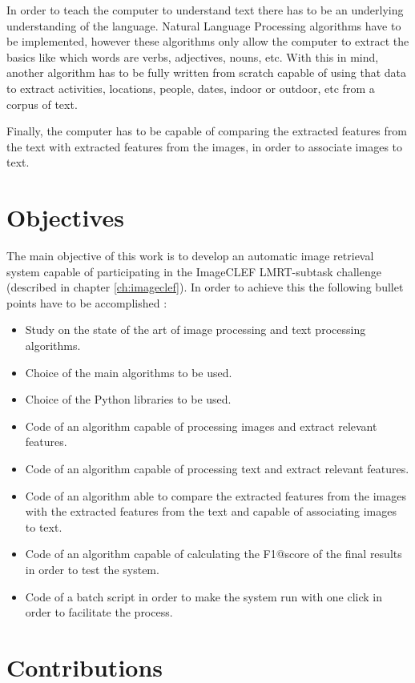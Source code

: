 In order to teach the computer to understand text there has to be an underlying understanding of the language. Natural Language Processing algorithms have to be implemented, however these algorithms only allow the computer to extract the basics like which words are verbs, adjectives, nouns, etc. With this in mind, another algorithm has to be fully written from scratch capable of using that data to extract activities, locations, people, dates, indoor or outdoor, etc from a corpus of text.

Finally, the computer has to be capable of comparing the extracted features from the text with extracted features from the images, in order to associate images to text.

\section{Objectives}

The main objective of this work is to develop an automatic image retrieval system capable of participating in the ImageCLEF LMRT-subtask challenge (described in chapter \ref{ch:imageclef}). In order to achieve this the following bullet points have to be accomplished :

\begin{itemize}
    \item Study on the state of the art of image processing and text processing algorithms.
    \item Choice of the main algorithms to be used.
    \item Choice of the Python libraries to be used.
    \item Code of an algorithm capable of processing images and extract relevant features.
    \item Code of an algorithm capable of processing text and extract relevant features.
    \item Code of an algorithm able to compare the extracted features from the images with the extracted features from the text and capable of associating images to text.
    \item Code of an algorithm capable of calculating the F1@score of the final results in order to test the system.
    \item Code of a batch script in order to make the system run with one click in order to facilitate the process.
  \end{itemize}


\section{Contributions}


